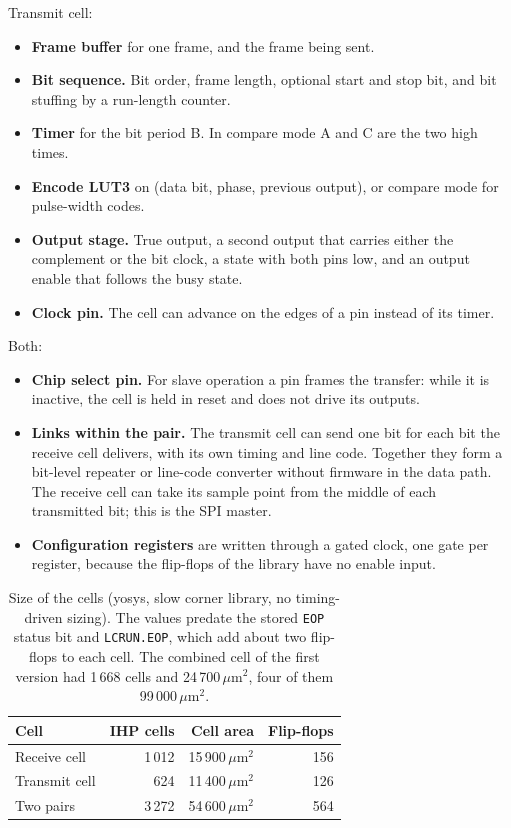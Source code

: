 \documentclass[10pt,a4paper]{article}
\newcommand{\reg}[1]{\texttt{#1}}
\begin{document}
Transmit cell:
\begin{itemize}
\item \textbf{Frame buffer} for one frame, and the frame being sent.
\item \textbf{Bit sequence.} Bit order, frame length, optional start and stop bit, and bit stuffing by a run-length
counter.
\item \textbf{Timer} for the bit period B. In compare mode A and C are the two high times.
\item \textbf{Encode LUT3} on (data bit, phase, previous output), or compare mode for pulse-width codes.
\item \textbf{Output stage.} True output, a second output that carries either the complement or the bit clock,
a state with both pins low, and an output enable that follows the busy state.
\item \textbf{Clock pin.} The cell can advance on the edges of a pin instead of its timer.
\end{itemize}

Both:
\begin{itemize}
\item \textbf{Chip select pin.} For slave operation a pin frames the transfer: while it is inactive, the cell is
held in reset and does not drive its outputs.
\item \textbf{Links within the pair.} The transmit cell can send one bit for each bit the receive cell delivers,
with its own timing and line code. Together they form a bit-level repeater or line-code converter without
firmware in the data path. The receive cell can take its sample point from the middle of each transmitted bit;
this is the SPI master.
\item \textbf{Configuration registers} are written through a gated clock, one gate per register, because the
flip-flops of the library have no enable input.
\end{itemize}

\begin{table}[H]
\centering\small
\begin{tabular}{@{}lrrr@{}}
\toprule
Cell & IHP cells & Cell area & Flip-flops \\
\midrule
Receive cell & 1\,012 & 15\,900\,$\mu$m$^2$ & 156 \\
Transmit cell & 624 & 11\,400\,$\mu$m$^2$ & 126 \\
Two pairs & 3\,272 & 54\,600\,$\mu$m$^2$ & 564 \\
\bottomrule
\end{tabular}
\caption{Size of the cells (yosys, slow corner library, no timing-driven sizing). The values predate the stored \reg{EOP} status bit and \reg{LCRUN.EOP}, which add about two flip-flops to each cell. The combined cell of the
first version had 1\,668 cells and 24\,700\,$\mu$m$^2$, four of them 99\,000\,$\mu$m$^2$.}
\end{table}
\end{document}
